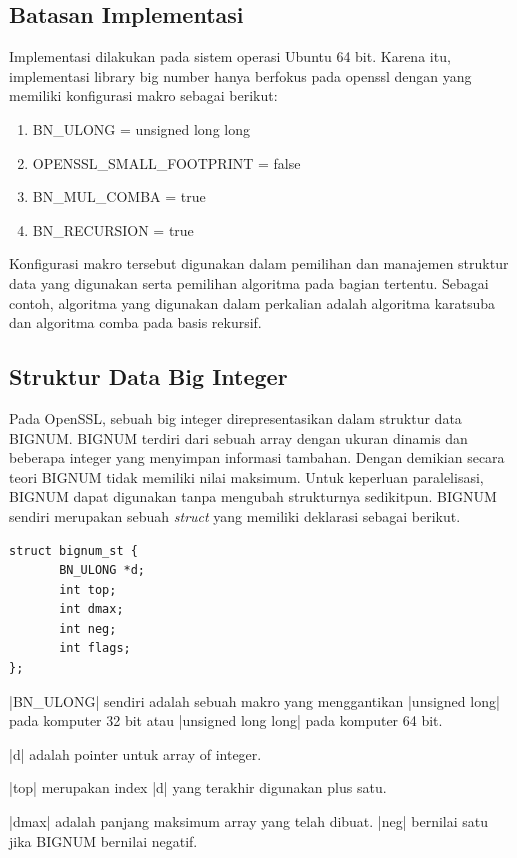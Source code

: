 \subsection{Batasan Implementasi}
Implementasi dilakukan pada sistem operasi Ubuntu 64 bit. Karena itu, implementasi library big number hanya berfokus pada openssl dengan yang memiliki konfigurasi makro sebagai berikut:
\begin{enumerate}[label=\roman*.]
  \item BN\_ULONG = unsigned long long
  \item OPENSSL\_SMALL\_FOOTPRINT = false
  \item BN\_MUL\_COMBA = true
  \item BN\_RECURSION = true

\end{enumerate}

Konfigurasi makro tersebut digunakan dalam pemilihan dan manajemen struktur data yang digunakan serta pemilihan algoritma pada bagian tertentu. Sebagai contoh, algoritma yang digunakan dalam perkalian adalah algoritma karatsuba dan algoritma comba pada basis rekursif.

\subsection{Struktur Data Big Integer} \label{sec:bignum_struct}
Pada OpenSSL, sebuah big integer direpresentasikan dalam struktur data BIGNUM. BIGNUM terdiri dari sebuah array dengan ukuran dinamis dan beberapa integer yang menyimpan informasi tambahan. Dengan demikian secara teori BIGNUM tidak memiliki nilai maksimum. Untuk keperluan paralelisasi, BIGNUM dapat digunakan tanpa mengubah strukturnya sedikitpun. BIGNUM sendiri merupakan sebuah \textit{struct} yang memiliki deklarasi sebagai berikut.

\begin{lstlisting}[style = code]
struct bignum_st {
       BN_ULONG *d;
       int top;
       int dmax;
       int neg;
       int flags;
};
\end{lstlisting}

|BN_ULONG| sendiri adalah sebuah makro yang menggantikan |unsigned long| pada komputer 32 bit atau |unsigned long long| pada komputer 64 bit.

|d| adalah pointer untuk array of integer.

|top| merupakan index |d| yang terakhir digunakan plus satu.

|dmax| adalah panjang maksimum array yang telah dibuat. |neg| bernilai satu jika BIGNUM bernilai negatif.

